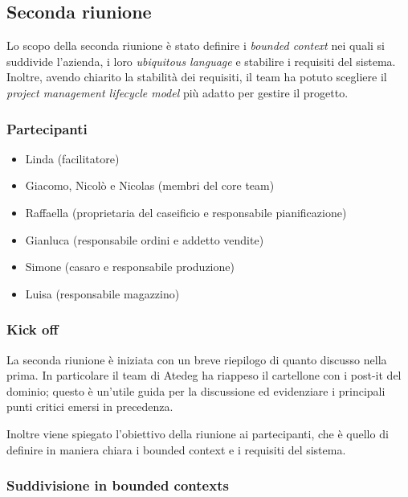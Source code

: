 \subsection{Seconda riunione}
\label{sec:seconda-riunione}

Lo scopo della seconda riunione è stato definire i \emph{bounded context} nei quali si suddivide l'azienda, i loro \emph{ubiquitous language} e stabilire i requisiti del sistema. Inoltre, avendo chiarito la stabilità dei requisiti, il team ha potuto scegliere il \emph{project management lifecycle model} più adatto per gestire il progetto.

\subsubsection{Partecipanti}
\label{sec:seconda-riunione-partecipanti}
\begin{itemize}
  \item Linda (facilitatore)
  \item Giacomo, Nicolò e Nicolas (membri del core team)
  \item Raffaella (proprietaria del caseificio e responsabile pianificazione)
  \item Gianluca (responsabile ordini e addetto vendite)
  \item Simone (casaro e responsabile produzione)
  \item Luisa (responsabile magazzino)
\end{itemize}

\subsubsection{Kick off}
\label{sec:seconda-riunione-kick-off}
La seconda riunione è iniziata con un breve riepilogo di quanto discusso nella prima.
In particolare il team di Atedeg ha riappeso il cartellone con i post-it del dominio; questo è un'utile guida per la discussione ed evidenziare i principali punti critici emersi in precedenza.

Inoltre viene spiegato l'obiettivo della riunione ai partecipanti, che è quello di definire in maniera chiara i bounded context e i requisiti del sistema.

\subsubsection{Suddivisione in bounded contexts}
\label{sec:seconda-riunione-svolgimento}

